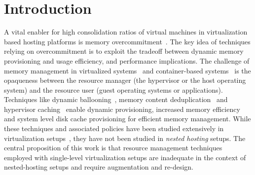 \section{Introduction}
\label{sec:intro}

A vital enabler for high consolidation ratios of virtual machines
in virtualization based hosting platforms
is memory overcommitment~\cite{vmware,vmware:memory}. 
%
The key idea of techniques relying on
overcommitment is to exploit the tradeoff between
dynamic memory provisioning and usage efficiency, and 
performance implications.
%
%
%
%
The challenge of memory management in virtualized systems~\cite{xen,kvm,vmware}
and container-based systems~\cite{cgroup,docker,lxc} is 
the opaqueness between the resource manager (the hypervisor or
the host operating system) and the resource user (guest operating
systems or applications).
%
%
Techniques like dynamic ballooning~\cite{vmware,hotplug}, memory
content deduplication~\cite{vmware,ksmpaper} and hypervisor 
caching~\cite{memtrans,oracletmem,kvmzcache, geiger} 
enable dynamic provisioning, increased memory efficiency and 
system level disk cache provisioning for efficient memory 
management. %
%
While these techniques and associated policies have been studied
extensively in virtualization setups~\cite{vmware, membal, membud, kvmzcache, tws},
they have not been studied in \emph{nested hosting} setups.
The central proposition of this work is that resource management
techniques employed with single-level virtualization setups
are inadequate in the context of nested-hosting setups 
and require augmentation and re-design.

